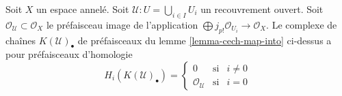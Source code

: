 \begin{lemma}

\label{lemma-homology-complex}
Soit $X$ un espace annelé. Soit $\mathcal{U} : U = \bigcup_{i \in I} U_i$ un recouvrement ouvert. Soit $\mathcal{O}_\mathcal{U} \subset \mathcal{O}_X$ le préfaisceau image de l'application $\bigoplus j_{p!}\mathcal{O}_{U_i} \to \mathcal{O}_X$. Le complexe de chaînes $K(\mathcal{U})_\bullet$ de préfaisceaux du lemme \ref{lemma-cech-map-into} ci-dessus a pour préfaisceaux d'homologie $$
H_i(K(\mathcal{U})_\bullet) =
\left\{
\begin{matrix}
0 & \text{si} & i \not = 0 \\
\mathcal{O}_\mathcal{U} & \text{si} & i = 0
\end{matrix}
\right.
$$
\end{lemma}

